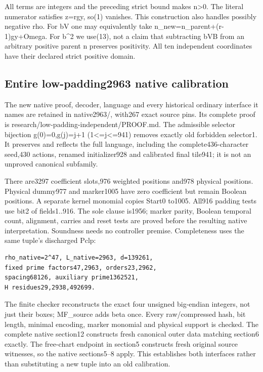 All terms are integers and the preceding strict bound makes
n\textgreater0. The literal numerator satisfies z=rgy, so(1) vanishes.
This construction also handles possibly negative rho. For bV one may
equivalently take n\_new=n\_parent+(r-1)gy+Omega. For b\^{}2 we use(13),
not a claim that subtracting bVB from an arbitrary positive parent n
preserves positivity. All ten independent coordinates have their
declared strict positive domain.

\subsection{Entire low-padding2963 native
calibration}\label{entire-low-padding2963-native-calibration}

The new native proof, decoder, language and every historical ordinary
interface it names are retained in native2963/, with267 exact source
pins. Its complete proof is research/low-padding-independent/PROOF.md.
The admissible selector bijection g(0)=0,g(j)=j+1
(1\textless=j\textless=941) removes exactly old forbidden selector1. It
preserves and reflects the full language, including the
complete436-character seed,430 actions, renamed initializer928 and
calibrated final tile941; it is not an unproved canonical subfamily.

There are3297 coefficient slots,976 weighted positions and978 physical
positions. Physical dummy977 and marker1005 have zero coefficient but
remain Boolean positions. A separate kernel monomial copies Start0
to1005. All916 padding tests use bit2 of fields1..916. The sole clause
is1956; marker parity, Boolean temporal count, alignment, carries and
reset tests are proved before the resulting native interpretation.
Soundness needs no controller premise. Completeness uses the same
tuple's discharged Pclp:

\begin{verbatim}
rho_native=2^47, L_native=2963, d=139261,
fixed prime factors47,2963, orders23,2962,
spacing68126, auxiliary prime1362521,
H residues29,2938,492699.
\end{verbatim}

The finite checker reconstructs the exact four unsigned big-endian
integers, not just their boxes; MF\_source adds beta once. Every
raw/compressed hash, bit length, minimal encoding, marker monomial and
physical support is checked. The complete native section12 constructs
fresh canonical outer data matching section6 exactly. The free-chart
endpoint in section5 constructs fresh original source witnesses, so the
native sections5--8 apply. This establishes both interfaces rather than
substituting a new tuple into an old calibration.

